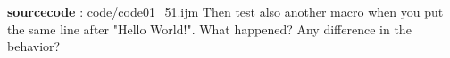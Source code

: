\textbf{sourcecode} : \href{http://www.example.com/contents}{code/code01\_51.ijm}
Then test also another macro when you put the same line after "Hello World!". 
What happened? Any difference in the behavior? 
\item